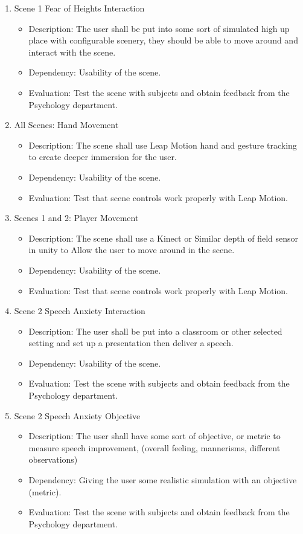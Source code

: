 \documentclass[a4paper,10pt]{article}
\begin{document}
\begin{enumerate}
		\item Scene 1 Fear of Heights Interaction 
		\begin{itemize}
		\item Description: The user shall be put into some sort of simulated high up place with configurable scenery, they should be able to move around and interact with the scene.
		\item Dependency: Usability of the scene.
		\item Evaluation: Test the scene with subjects and obtain feedback from the Psychology department. 
		\end{itemize}
		
		\item All Scenes: Hand Movement
		\begin{itemize}
		\item Description: The scene shall use Leap Motion hand and gesture tracking to create deeper immersion for the user.
		\item Dependency: Usability of the scene.
		\item Evaluation: Test that scene controls work properly with Leap Motion. 
		\end{itemize}
		
		
		\item Scenes 1 and 2: Player Movement
		\begin{itemize}
		\item Description: The scene shall use a Kinect or Similar depth of field sensor in unity to Allow the user to move around in the scene.
		\item Dependency: Usability of the scene.
		\item Evaluation: Test that scene controls work properly with Leap Motion. 
		\end{itemize}
		
		
		
		\item Scene 2 Speech Anxiety Interaction
		\begin{itemize}
		\item Description: The user shall be put into a classroom or other selected setting and set up a presentation then deliver a speech.
		\item Dependency: Usability of the scene.
		\item Evaluation: Test the scene with subjects and obtain feedback from the Psychology department.  
		\end{itemize}
		\item Scene 2 Speech Anxiety Objective 
		\begin{itemize}
		\item Description: The user shall have some sort of objective, or metric to measure speech improvement, (overall feeling, mannerisms, different observations)
		\item Dependency: Giving the user some realistic simulation with an objective (metric).
		\item Evaluation: Test the scene with subjects and obtain feedback from the Psychology department. 
		\end{itemize}
				

\end{enumerate}
\end{document}
